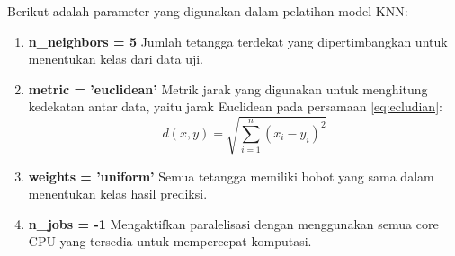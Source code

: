 \par Berikut adalah parameter yang digunakan dalam pelatihan model KNN:
\begin{enumerate}
    \item \textbf{n\_neighbors = 5}  
        Jumlah tetangga terdekat yang dipertimbangkan untuk menentukan kelas dari data uji.
    
    \item \textbf{metric = 'euclidean'}  
        Metrik jarak yang digunakan untuk menghitung kedekatan antar data, yaitu jarak Euclidean pada persamaan \ref{eq:ecludian}:
        \begin{equation}
                    d(x,y) = \sqrt{\sum_{i=1}^{n}(x_i - y_i)^2}
            \label{eq:ecludian}
        \end{equation}

    \item \textbf{weights = 'uniform'}  
        Semua tetangga memiliki bobot yang sama dalam menentukan kelas hasil prediksi.
    
    \item \textbf{n\_jobs = -1}  
        Mengaktifkan paralelisasi dengan menggunakan semua core CPU yang tersedia untuk mempercepat komputasi.
\end{enumerate}



